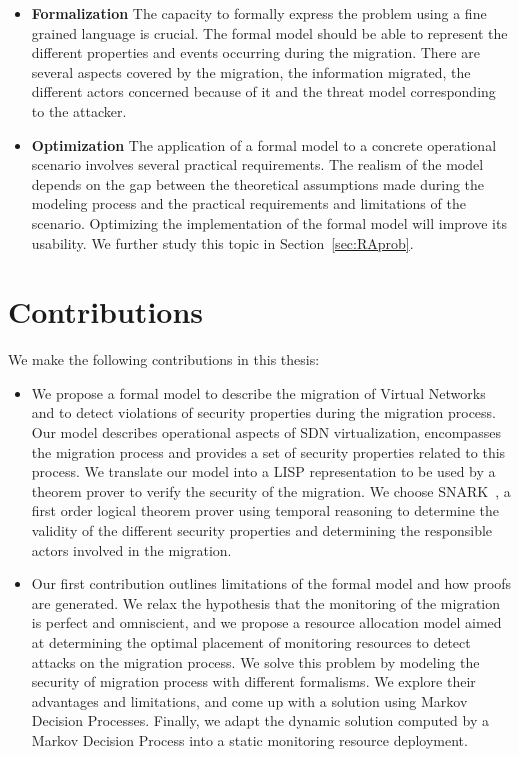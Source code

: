 \begin{itemize}
    \item \textbf{Formalization } The capacity to formally express the problem using a fine grained language is crucial. The formal model should be able to represent the different properties and events occurring during the migration.
    There are several aspects covered by the migration, the information migrated, the different actors concerned because of it and the threat model corresponding to the attacker.

    \item \textbf{Optimization} The application of a formal model to a concrete operational scenario involves several practical requirements. The realism of the model depends on the gap between the theoretical assumptions made during the modeling process and the practical requirements and limitations of the scenario. Optimizing the implementation of the formal model will improve its usability.
    We further study this topic in Section~\ref{sec:RAprob}.
    
    
\end{itemize}


\section{Contributions}
We make the following contributions in this thesis:

\begin{itemize}
    \item We propose a formal model to describe the migration of Virtual Networks and to detect violations of security properties during the migration process.
    Our model describes operational aspects of SDN virtualization, encompasses the migration process and provides a set of security properties related to this process. We translate our model into a LISP representation to be used by a theorem prover to verify the security of the migration. We choose SNARK~\cite{snark-Stickel2000}, a first order logical theorem prover using temporal reasoning to determine the validity of the different security properties and determining the responsible actors involved in the migration.
    
    \item Our first contribution outlines limitations of the formal model and how proofs are generated. We relax the hypothesis that the monitoring of the migration is perfect and omniscient, and we propose a resource allocation model aimed at determining the optimal placement of monitoring resources to detect attacks on the migration process. We solve this problem by modeling the security of migration process with different formalisms. We explore their advantages and limitations, and come up with a solution using Markov Decision Processes. Finally, we adapt the dynamic solution computed by a Markov Decision Process into a static monitoring resource deployment.
\end{itemize}

